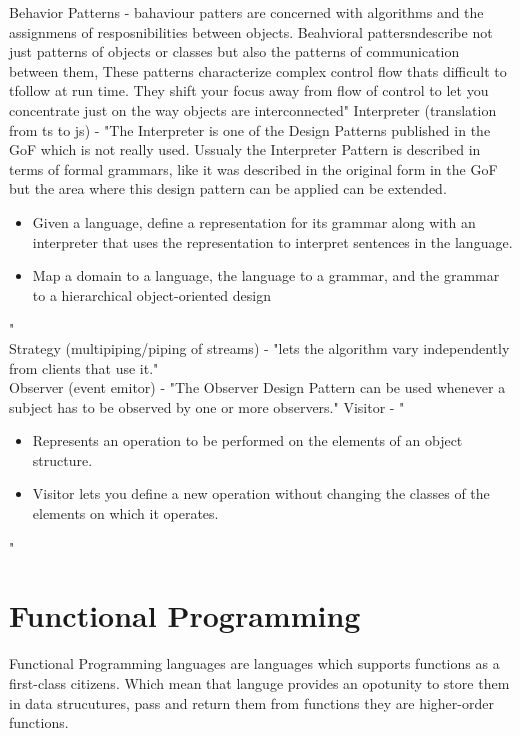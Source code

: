 Behavior Patterns - bahaviour patters are concerned with algorithms and the assignmens of resposnibilities between objects. Beahvioral pattersndescribe not just patterns of objects or classes but also the patterns of communication between them, These patterns characterize complex control flow thats difficult to tfollow at run time. They shift your focus away from flow of control to let you concentrate just on the way objects are interconnected"\cite{DesignPatterns}
Interpreter (translation from ts to js) - "The Interpreter is one of the Design Patterns published in the GoF which is not really used. Ussualy the Interpreter Pattern is described in terms of formal grammars, like it was described in the original form in the GoF but the area where this design pattern can be applied can be extended.
\begin{itemize}
\item Given a language, define a representation for its grammar along with an interpreter that uses the representation to interpret sentences in the language.
\item Map a domain to a language, the language to a grammar, and the grammar to a hierarchical object-oriented design
\end{itemize}"\cite{oosite}\\
Strategy (multipiping/piping of streams) - "lets the algorithm vary independently from clients that use it."\cite{oosite}\\
Observer (event emitor) - "The Observer Design Pattern can be used whenever a subject has to be observed by one or more observers."\cite{oosite}
Visitor  - "\begin{itemize}
\item Represents an operation to be performed on the elements of an object structure.
\item Visitor lets you define a new operation without changing the classes of the elements on which it operates.
\end{itemize}
"\cite{oosite}\\


\section{Functional Programming}
Functional Programming languages are languages which supports functions as a first-class citizens. Which mean that languge provides an opotunity to store them in data strucutures, pass and return them from functions they are higher-order functions\cite{Hudak}.

